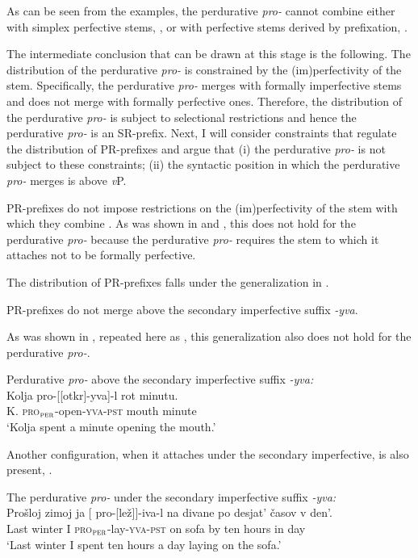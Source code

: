 \documentclass[output=paper,
]{langscibook}
\begin{document}
\noindent As can be seen from the examples, the perdurative \textit{pro-} cannot combine either with simplex perfective stems, , or with perfective stems derived by prefixation, .


The intermediate conclusion that can be drawn at this stage is the following. The distribution of the perdurative \textit{pro-} is constrained by the (im)perfectivity of the stem. Specifically, the perdurative \textit{pro-} merges with formally imperfective stems and does not merge with formally perfective ones. Therefore, the distribution of the perdurative \textit{pro-} is subject to selectional restrictions and hence the perdurative \textit{pro-} is an SR-prefix. Next, I will consider constraints that regulate the distribution of PR-prefixes and argue that (i) the perdurative \textit{pro-} is not subject to these constraints; (ii) the syntactic position in which the perdurative \textit{pro-} merges is above \textit{v}P.

PR-prefixes do not impose restrictions on the (im)perfectivity of the stem with which they combine \citep{tatevosov2009mnozestvennaja,tatevosov2013mnozestvennaja}. As was shown in  and , this does not hold for the perdurative \textit{pro-} because the perdurative \textit{pro-} requires the stem to which it attaches not to be formally perfective.

The distribution of PR-prefixes falls under the generalization in .

\ea \label{ex:naumov:15}
PR-prefixes do not merge above the secondary imperfective suffix \textit{-yva}.
\z

\noindent As was shown in , repeated here as , this generalization also does not hold for the perdurative \textit{pro-}.
 

 \ea Perdurative \textit{pro-} above the secondary imperfective suffix \textit{-yva:}\label{ex:naumov:16}\smallskip\\
     \gll Kolja	pro-[[otkr]-yva]-l		rot		minutu.\\
K.	\textsc{pro}$_\textsc{per}$-open-\textsc{yva}-\textsc{pst}	mouth		minute\\
     \glt `Kolja spent a minute opening the mouth.'
     \z


\noindent Another configuration, when it attaches under the secondary imperfective, is also present, .

\ea The perdurative \textit{pro-} under the secondary imperfective suffix \textit{-yva:}\label{ex:naumov:17}\smallskip\\
    \gll Prošloj	zimoj	ja	[\hspace{-2pt} pro-[lež]]-iva-l	na	divane	po	desjat’ časov	v	den’.\\
    Last	winter	I	{} \textsc{pro}$_\textsc{per}$-lay-\textsc{yva}-\textsc{pst}	on	sofa	by	ten hours	in	day \\
    \glt `Last winter I spent ten hours a day laying on the sofa.'
    \z
\end{document}
